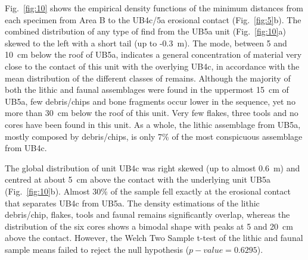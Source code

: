 \documentclass[preprint,authoryear,times]{elsarticle} %
\begin{document}
Fig.~\ref{fig:10} shows the empirical density functions of the minimum distances from each specimen from Area B to the UB4c/5a erosional contact (Fig.~\ref{fig:5}b). The combined distribution of any type of find from the UB5a unit (Fig.~\ref{fig:10}a) skewed to the left with a short tail (up to -0.3~m). The mode, between 5 and 10~cm below the roof of UB5a, indicates a general concentration of material very close to the contact of this unit with the overlying UB4c, in accordance with the mean distribution of the different classes of remains. %
Although the majority of both the lithic and faunal assemblages were found in the uppermost 15~cm of UB5a, few debris/chips and bone fragments occur lower in the sequence, yet no more than 30~cm below the roof of this unit. Very few flakes, three tools and no cores have been found in this unit. As a whole, the lithic assemblage from UB5a, mostly composed by debris/chips, is only 7\% of the most conspicuous assemblage from UB4c.

The global distribution of unit UB4c was right skewed (up to almost 0.6~m) and centred at about 5~cm above the contact with the underlying unit UB5a (Fig.~\ref{fig:10}b). Almost 30\% of the sample fell exactly at the erosional contact that separates UB4c from UB5a. The density estimations of the lithic debris/chip, flakes, tools and faunal remains significantly overlap, whereas the distribution of the six cores shows a bimodal shape with peaks at 5 and 20~cm above the contact. However, the Welch Two Sample t-test of the lithic and faunal sample means failed to reject the null hypothesis ($p-value=0.6295$). %
\end{document}

